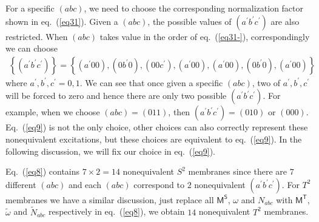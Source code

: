 \documentclass[11pt,nofootinbib,preprint]{revtex4-1}
\begin{document}
For a specific $\left( abc \right)$, we need to choose the corresponding normalization factor shown in eq.~(\ref{eq31}). Given a $\left( abc \right)$, the possible values of $\left( a^{\prime}b^{\prime}c^{\prime} \right)$ are also restricted. When $\left( abc \right)$ takes value in the order of eq.~(\ref{eq31-}), correspondingly we can choose
\begin{align}
	\left\{ \left( a^{\prime}b^{\prime}c^{\prime} \right) \right\} =\left\{ \left( a^{\prime}00 \right) ,\left( 0b^{\prime}0 \right) ,\left( 00c^{\prime} \right) ,\left( a^{\prime}00 \right) ,\left( a^{\prime}00 \right) ,\left( 0b^{\prime}0 \right) ,\left( a^{\prime}00 \right) \right\}  
	\label{eq9}
\end{align}
where $a^{\prime},b^{\prime},c^{\prime}=0,1$. We can see that once given a specific $\left( abc \right)$, two of $a^{\prime},b^{\prime},c^{\prime}$ will be forced to zero and hence there are only two possible $\left( a^{\prime}b^{\prime}c^{\prime} \right)$. For example, when we choose $\left( abc \right)=\left( 011 \right)$, then $\left( a^{\prime}b^{\prime}c^{\prime} \right)=\left( 010 \right)$ or $\left( 000 \right)$. Eq.~(\ref{eq9}) is not the only choice, other choices can also correctly represent these nonequivalent excitations, but these choices are equivalent to eq.~(\ref{eq9}). In the following discussion, we will fix our choice in eq.~(\ref{eq9}).

Eq.~(\ref{eq8}) contains $7\times2=14$ nonequivalent $S^2$ membranes since there are $7$ different $\left( abc \right)$ and each $\left( abc \right)$ correspond to $2$ nonequivalent $\left( a^{\prime}b^{\prime}c^{\prime} \right)$. For $T^2$ membranes we have a similar discussion, just replace all $\mathsf{M^S}$, $\omega$ and $N_{abc}$ with $\mathsf{M^T}$, $\tilde{\omega}$ and $\tilde{N}_{abc}$ respectively in eq.~(\ref{eq8}), we obtain $14$ nonequivalent $T^2$ membranes.
\end{document}

